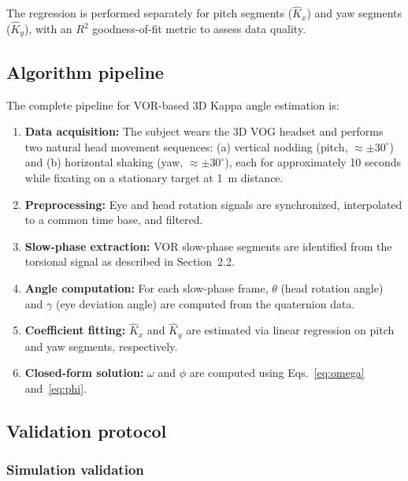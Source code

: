 \documentclass[review,numbers,sort&compress]{elsarticle}
\begin{document}
The regression is performed separately for pitch segments ($\hat{K}_x$) and yaw segments ($\hat{K}_y$), with an $R^2$ goodness-of-fit metric to assess data quality.

\subsection{Algorithm pipeline}

The complete pipeline for VOR-based 3D Kappa angle estimation is:

\begin{enumerate}
    \item \textbf{Data acquisition:} The subject wears the 3D VOG headset and performs two natural head movement sequences: (a) vertical nodding (pitch, $\approx\pm30^\circ$) and (b) horizontal shaking (yaw, $\approx\pm30^\circ$), each for approximately 10 seconds while fixating on a stationary target at 1~m distance.
    \item \textbf{Preprocessing:} Eye and head rotation signals are synchronized, interpolated to a common time base, and filtered.
    \item \textbf{Slow-phase extraction:} VOR slow-phase segments are identified from the torsional signal as described in Section~2.2.
    \item \textbf{Angle computation:} For each slow-phase frame, $\theta$ (head rotation angle) and $\gamma$ (eye deviation angle) are computed from the quaternion data.
    \item \textbf{Coefficient fitting:} $\hat{K}_x$ and $\hat{K}_y$ are estimated via linear regression on pitch and yaw segments, respectively.
    \item \textbf{Closed-form solution:} $\omega$ and $\phi$ are computed using Eqs.~\ref{eq:omega} and~\ref{eq:phi}.
\end{enumerate}

\subsection{Validation protocol}

\subsubsection{Simulation validation}
\end{document}
